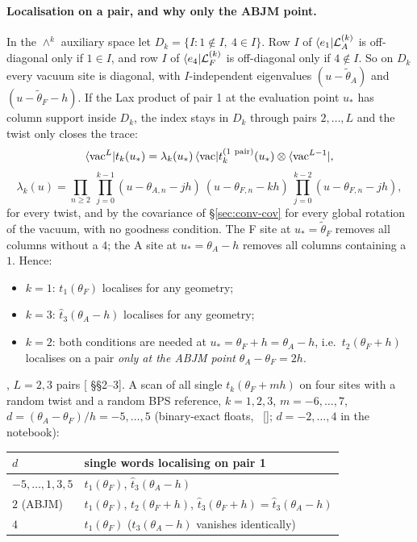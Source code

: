 \paragraph{Localisation on a pair, and why only the ABJM point.} In the $\wedge^k$ auxiliary space let
$D_k=\{I:1\notin I,\ 4\in I\}$. Row $I$ of $\langle e_1|\mathcal L^{(k)}_A$ is off-diagonal only if $1\in I$, and row $I$ of
$\langle e_4|\mathcal L^{(k)}_F$ is off-diagonal only if $4\notin I$. So on $D_k$ every vacuum site is diagonal, with $I$-independent
eigenvalues $(u-\tilde\theta_A)$ and $(u-\tilde\theta_F-h)$. If the Lax product of pair 1 at the evaluation point $u_*$ has
column support inside $D_k$, the index stays in $D_k$ through pairs $2,\dots,L$ and the twist only closes the trace:
\begin{equation}
 \bra{\vac^L}t_k(u_*)=\lambda_k(u_*)\,\bra{\vac}t_k^{(1\ \rm pair)}(u_*)\otimes\bra{\vac^{L-1}},
\end{equation}
\begin{equation}
 \lambda_k(u)=\prod_{n\ge2}\ \prod_{j=0}^{k-1}(u-\theta_{A,n}-jh)\ (u-\theta_{F,n}-kh)\ \prod_{j=0}^{k-2}(u-\theta_{F,n}-jh),
\end{equation}
for every twist, and by the covariance of \S\ref{sec:conv-cov} for every global rotation of the vacuum, with no goodness
condition. The F site at $u_*=\tilde\theta_F$ removes all columns without a $4$; the A site at $u_*=\theta_A-h$ removes all
columns containing a $1$. Hence:
\begin{itemize}
\item $k=1$: $t_1(\theta_F)$ localises for any geometry;
\item $k=3$: $\hat t_3(\theta_A-h)$ localises for any geometry;
\item $k=2$: both conditions are needed at $u_*=\theta_F+h=\theta_A-h$, i.e.\ $t_2(\theta_F+h)$ localises on a pair
 \emph{only at the ABJM point} $\theta_A-\theta_F=2h$.
\end{itemize}
\ex, $L=2,3$ pairs [ \S\S2--3]. A scan of all single $t_k(\theta_F+mh)$ on four sites
with a random twist and a random BPS reference, $k=1,2,3$, $m=-6,\dots,7$, $d=(\theta_A-\theta_F)/h=-5,\dots,5$ (binary-exact
floats, \npy\ []; $d=-2,\dots,4$ in the notebook):
\begin{center}
\small
\begin{tabular}{@{}ll@{}}
\toprule
$d$ & single words localising on pair 1\\
\midrule
$-5,\dots,1,3,5$ & $t_1(\theta_F)$, $\hat t_3(\theta_A-h)$\\
$2$ (ABJM) & $t_1(\theta_F)$, $t_2(\theta_F+h)$, $\hat t_3(\theta_F+h)=\hat t_3(\theta_A-h)$\\
$4$ & $t_1(\theta_F)$ ($t_3(\theta_A-h)$ vanishes identically)\\
\bottomrule
\end{tabular}
\end{center}

